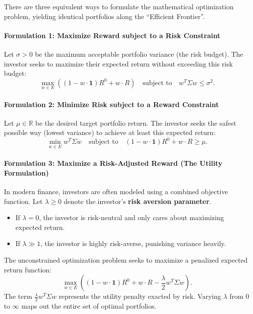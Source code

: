 There are three equivalent ways to formulate the mathematical optimization problem, yielding identical portfolios along the ``Efficient Frontier''.

\paragraph{Formulation 1: Maximize Reward subject to a Risk Constraint}
Let $\sigma > 0$ be the maximum acceptable portfolio variance (the risk budget). The investor seeks to maximize their expected return without exceeding this risk budget:
\begin{equation}
    \max_{w \in E} \left( (1 - w \cdot \mathbf{1}) R^0 + w \cdot R \right) \quad \text{subject to} \quad w^T \Sigma w \leq \sigma^2.
\end{equation}

\paragraph{Formulation 2: Minimize Risk subject to a Reward Constraint}
Let $\mu \in \mathbb{R}$ be the desired target portfolio return. The investor seeks the safest possible way (lowest variance) to achieve at least this expected return:
\begin{equation}
    \min_{w \in E} w^T \Sigma w \quad \text{subject to} \quad (1 - w \cdot \mathbf{1}) R^0 + w \cdot R \geq \mu.
\end{equation}

\paragraph{Formulation 3: Maximize a Risk-Adjusted Reward (The Utility Formulation)}
In modern finance, investors are often modeled using a combined objective function. Let $\lambda \ge 0$ denote the investor's \textbf{risk aversion parameter}. 
\begin{itemize}
    \item If $\lambda = 0$, the investor is risk-neutral and only cares about maximizing expected return.
    \item If $\lambda \gg 1$, the investor is highly risk-averse, punishing variance heavily.
\end{itemize}
The unconstrained optimization problem seeks to maximize a penalized expected return function:
\begin{equation}
    \max_{w \in E} \left( (1 - w \cdot \mathbf{1}) R^0 + w \cdot R - \frac{\lambda}{2} w^T \Sigma w \right).
\end{equation}
The term $\frac{\lambda}{2} w^T \Sigma w$ represents the utility penalty exacted by risk. Varying $\lambda$ from $0$ to $\infty$ maps out the entire set of optimal portfolios.
